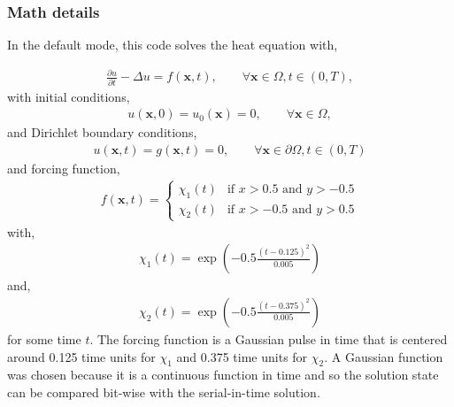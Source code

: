 \documentclass{article}
\begin{document}
\subsubsection{Math details}\label{math-details}

In the default mode, this code solves the heat equation with,

\begin{align}
  \frac{\partial u}{\partial t} - \Delta u = f(\boldsymbol{x},t), \qquad \forall\boldsymbol{x}\in\Omega,t\in\left(
  0,T \right),
\end{align}
with initial conditions,
\begin{align}
  u(\boldsymbol{x},0) = u_0(\boldsymbol{x}) = 0, \qquad \forall \boldsymbol{x}\in\Omega,
\end{align}
and Dirichlet boundary conditions,
\begin{align}
  u(\boldsymbol{x},t) = g(\boldsymbol{x},t) = 0, \qquad \forall \boldsymbol{x}\in\partial\Omega,t\in\left( 0,T \right)
\end{align}
and forcing function,
\begin{align}
  f(\mathbf x, t) = \left\{
  \begin{array}{ll}
    \chi_1(t) & \text{if  \(x>0.5\) and \(y>-0.5\)} \\
    \chi_2(t) & \text{if \(x>-0.5\) and \(y>0.5\)}
  \end{array}
  \right.
\end{align}
with,
\begin{align}
  \chi_1(t) = \exp\left(-0.5\frac{(t-0.125)^2}{0.005}\right)
\end{align}
and,
\begin{align}
  \chi_2(t) = \exp\left(-0.5\frac{(t-0.375)^2}{0.005}\right)
\end{align}
for
some time \(t\). The forcing function is a Gaussian pulse in time that
is centered around 0.125 time units for \(\chi_1\) and 0.375 time units
for \(\chi_2\). A Gaussian function was chosen because it is a
continuous function in time and so the solution state can be compared
bit-wise with the serial-in-time solution.
\end{document}
